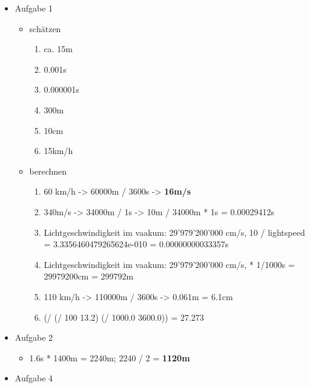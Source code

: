 \documentclass[11pt]{article}
\begin{document}
\begin{enumerate}
\begin{enumerate}
\begin{itemize}
\item Aufgabe 1
\begin{itemize}
\item schätzen
\begin{enumerate}
\item ca. 15m
\item 0.001s
\item 0.000001s
\item 300m
\item 10cm
\item 15km/h
\end{enumerate}
\item berechnen
\begin{enumerate}
\item 60 km/h -> 60000m / 3600s -> \textbf{16m/s}
\item 340m/s -> 34000m / 1s -> 10m / 34000m * 1s = 0.00029412s
\item Lichtgeschwindigkeit im vaakum: 29'979'200'000 cm/s, 10 / lightspeed = 3.3356460479265624e-010 = 0.00000000033357s
\item Lichtgeschwindigkeit im vaakum: 29'979'200'000 cm/s, * 1/1000s = 29979200cm = 299792m
\item 110 km/h -> 110000m / 3600s -> 0.061m = 6.1cm
\item (/ (/ 100  13.2) (/ 1000.0 3600.0)) = 27.273
\end{enumerate}
\end{itemize}
\item Aufgabe 2
\begin{itemize}
\item 1.6s * 1400m = 2240m; 2240 / 2 = \textbf{1120m}
\end{itemize}
\item Aufgabe 4
\end{itemize}
\end{enumerate}
\end{enumerate}
\end{document}

